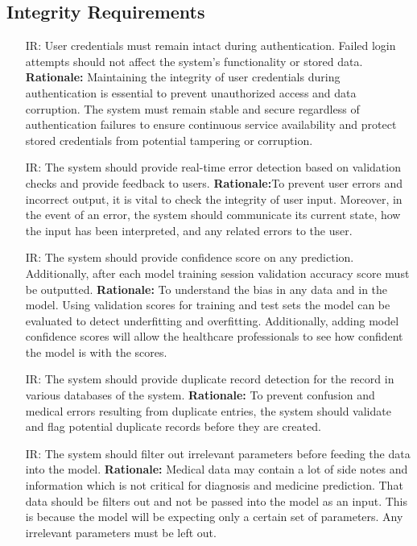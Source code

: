 \documentclass{article}
\newcounter{irnum} %
\newcounter{srnum} %
\begin{document}
\subsection{Integrity Requirements}
\begin{itemize}
    \item [IR\refstepcounter{irnum}\theirnum \label{IR_Autentication}:] User credentials must remain intact during authentication. Failed login attempts should not affect the system's functionality or stored data.
    \textbf{Rationale:} Maintaining the integrity of user credentials during authentication is essential to prevent unauthorized access and data corruption. The system must remain stable and secure regardless of authentication failures to ensure continuous service availability and protect stored credentials from potential tampering or corruption.

    \item [IR\refstepcounter{irnum}\theirnum \label{IR_ErrorDetection}:] The system should provide real-time error detection based on validation checks and provide feedback to users.
    \textbf{Rationale:}To prevent user errors and incorrect output, it is vital to check the integrity of user input. Moreover, in the event of an error, the system should communicate its current state, how the input has been interpreted, and any related errors to the user.

    \item [IR\refstepcounter{irnum}\theirnum \label{IR_ValidationScore}:] The system should provide confidence score on any prediction. Additionally, after each model training session validation accuracy score must be outputted.
    \textbf{Rationale:} To understand the bias in any data and in the model. Using validation scores for training and test sets the model can be evaluated to detect underfitting and overfitting. Additionally, adding model confidence scores will allow  the healthcare professionals to see how confident the model is with the scores.
    
    \item [IR\refstepcounter{irnum}\theirnum \label{IR_DuplicateRecordDetection}:] The system should provide duplicate record detection for the record in various databases of the system.
    \textbf{Rationale:} To prevent confusion and medical errors resulting from duplicate entries, the system should validate and flag potential duplicate records before they are created.

    \item [IR\refstepcounter{irnum}\thesrnum \label{IR_InputCheck}:] The system should filter out irrelevant parameters before feeding the data into the model. 
    \textbf{Rationale:} Medical data may contain a lot of side notes and information which is not critical for diagnosis and medicine prediction. That data should be filters out and not be passed into the model as an input. This is because the model will be expecting only a certain set of parameters. Any irrelevant parameters must be left out. 

\end{itemize}
\end{document}
